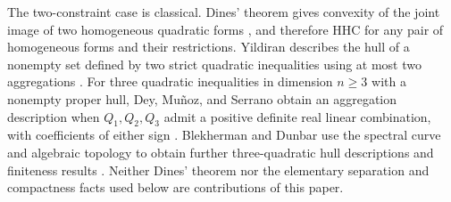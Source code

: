 The two-constraint case is classical. Dines' theorem gives convexity of
the joint image of two homogeneous quadratic forms \citep{Dines1941},
and therefore HHC for any pair of homogeneous forms and their
restrictions. Yildiran describes the hull of a nonempty set defined by
two strict quadratic inequalities using at most two aggregations
\citep{Yildiran2009}. For three quadratic inequalities in dimension
$n\geq3$ with a nonempty proper hull, Dey, Mu\~noz, and Serrano obtain
an aggregation description when $Q_1,Q_2,Q_3$ admit a positive definite
real linear combination, with coefficients of either sign
\citep{DMS2022}. Blekherman and Dunbar use the spectral curve and
algebraic topology to obtain further three-quadratic hull descriptions
and finiteness results \citep{BD2025,BDpreprint}. Neither Dines'
theorem nor the elementary separation and compactness facts used below
are contributions of this paper.
